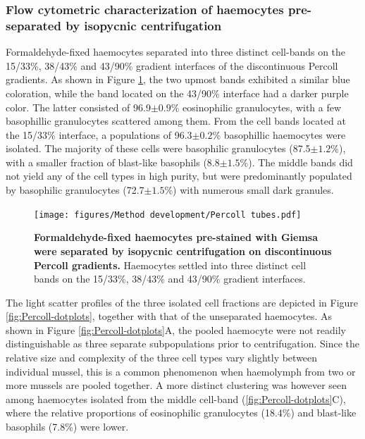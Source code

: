 \subsubsection{Flow cytometric characterization of haemocytes pre-separated by isopycnic centrifugation }
Formaldehyde-fixed haemocytes separated into three distinct cell-bands on the 15/33\%, 38/43\% and 43/90\% gradient interfaces of the discontinuous Percoll gradients. As shown in Figure \ref{fig:Percoll-tubes}, the two upmost bands exhibited a similar blue coloration, while the band located on the 43/90\% interface had a darker purple color. The latter consisted of 96.9$\pm{0.9}$\% eosinophilic granulocytes, with a few basophillic granulocytes scattered among them. From the cell bands located at the 15/33\% interface, a populations of 96.3$\pm{0.2}$\% basophillic haemocytes were isolated. The majority of these cells were basophilic granulocytes (87.5$\pm{1.2}$\%), with a smaller fraction of blast-like basophils (8.8$\pm{1.5}$\%). The middle bands did not yield any of the cell types in high purity, but were predominantly populated by basophilic granulocytes (72.7$\pm{1.5}$\%) with numerous small dark granules.

\begin{figure}[H]
    \centering
    \texttt{[image: figures/Method development/Percoll tubes.pdf]}
    \caption{\textbf{Formaldehyde-fixed haemocytes pre-stained with Giemsa were separated by isopycnic centrifugation on discontinuous Percoll gradients.} Haemocytes settled into three distinct cell bands on the 15/33\%, 38/43\% and 43/90\% gradient interfaces.}
    \label{fig:Percoll-tubes}
\end{figure}

The light scatter profiles of the three isolated cell fractions are depicted in Figure \ref{fig:Percoll-dotplots}, together with that of the unseparated haemocytes. As shown in Figure \ref{fig:Percoll-dotplots}A, the pooled haemocyte were not readily distinguishable as three separate subpopulations prior to centrifugation. Since the relative size and complexity of the three cell types vary slightly between individual mussel, this is a common phenomenon when haemolymph from two or more mussels are pooled together. A more distinct clustering was however seen among haemocytes isolated from the middle cell-band (\ref{fig:Percoll-dotplots}C), where the relative proportions of eosinophilic granulocytes (18.4\%) and blast-like basophils (7.8\%) were lower.

